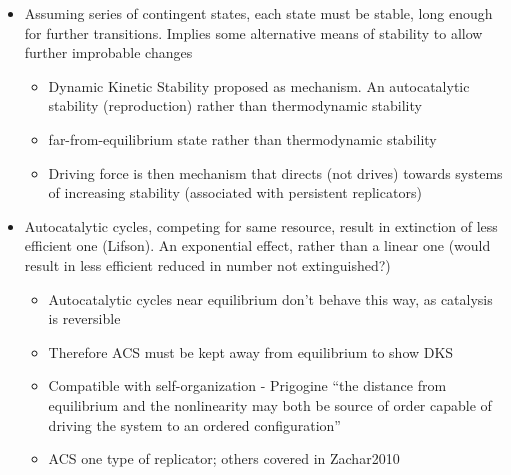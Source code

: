\begin{itemize}
\begin{itemize}
			\end{itemize}
			\item
			
			Assuming series of contingent states, each state must be stable, long
			enough for further transitions. Implies some alternative means of
			stability to allow further improbable changes
			
			
			\begin{itemize}
				\item
				
				Dynamic Kinetic Stability proposed as mechanism. An autocatalytic
				stability (reproduction) rather than thermodynamic stability
				
				\item
				
				far-from-equilibrium state rather than thermodynamic stability
				
				\item
				
				Driving force is then mechanism that directs (not drives) towards
				systems of increasing stability (associated with persistent
				replicators)
				
			\end{itemize}
			\item
			
			Autocatalytic cycles, competing for same resource, result in
			extinction of less efficient one (Lifson). An exponential effect,
			rather than a linear one (would result in less efficient reduced in
			number not extinguished?)
			
			
			\begin{itemize}
				\item
				
				Autocatalytic cycles near equilibrium don't behave this way, as
				catalysis is reversible
				
				\item
				
				Therefore ACS must be kept away from equilibrium to show DKS
				
				\item
				
				Compatible with self-organization - Prigogine ``the distance from
				equilibrium and the nonlinearity may both be source of order capable
				of driving the system to an ordered configuration''
				
				\item
				
				ACS one type of replicator; others covered in Zachar2010
				

\end{itemize}
\end{itemize}
